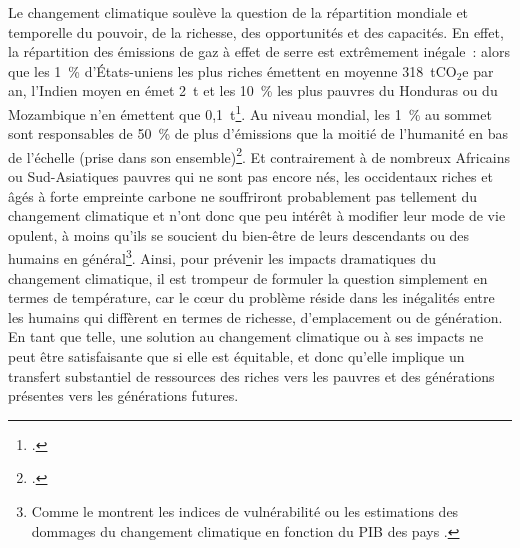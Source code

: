\documentclass[a5paper,french,openany]{memoir}
\begin{document}
Le changement climatique soulève la question de la répartition mondiale et temporelle du pouvoir, de la richesse, des opportunités et des capacités. En effet, la répartition des émissions de gaz à effet de serre est extrêmement inégale~: alors que les 1~\% d'États-uniens les plus riches émettent en moyenne 318~tCO$_\text{2}$e par an, l'Indien moyen en émet 2~t et les 10~\% les plus pauvres du Honduras ou du Mozambique n'en émettent que 0,1~t\footnote{\citet{chancel_carbon_2015}.}. Au niveau mondial, les 1~\% au sommet sont responsables de 50~\% de plus d'émissions que la moitié de l'humanité en bas de l'échelle (prise dans son ensemble)\footnote{\cite{bruckner_impacts_2022}.}. 
Et contrairement à de nombreux Africains ou Sud-Asiatiques pauvres qui ne sont pas encore nés, les occidentaux riches et âgés à forte empreinte carbone ne souffriront probablement pas tellement du changement climatique et n'ont donc que peu intérêt à modifier leur mode de vie opulent, à moins qu'ils se soucient du bien-être de leurs descendants ou des humains en général\footnote{Comme le montrent les indices de vulnérabilité \citep{chen_university_2015} ou les estimations des dommages du changement climatique en fonction du PIB des pays \citep{burke_global_2015}.}. 
Ainsi, pour prévenir les impacts dramatiques du changement climatique, il est trompeur de formuler la question simplement en termes de température, %
car le cœur du problème réside dans les inégalités entre les humains qui diffèrent en termes de richesse, d'emplacement ou de génération. En tant que telle, une solution au changement climatique ou à ses impacts ne peut être satisfaisante que si elle est équitable, et donc qu'elle implique un transfert substantiel de ressources des riches vers les pauvres et des générations présentes vers les générations futures.%

\end{document}
